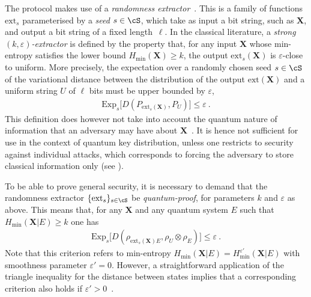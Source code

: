 The protocol makes use of a \emph{randomness extractor}~\cite{Zuc90,Shaltiel04}. This is a family of functions $\mathrm{ext}_s$ parameterised by a \emph{seed} $s \in \cS$, which take as input a bit string, such as $\mathbf{X}$, and output a bit string of a fixed length~$\ell$. In the classical literature, a \emph{strong $(k, \varepsilon)$-extractor} is defined by the property that, for any input $\mathbf{X}$ whose min-entropy satisfies the lower bound $H_{\min}(\mathbf{X}) \geq k$, the output $\mathrm{ext}_s(\mathbf{X})$ is $\varepsilon$-close to uniform. More precisely, the expectation over a randomly chosen seed $s \in \cS$ of the variational distance between the distribution of the output $\mathrm{ext}(\mathbf{X})$ and a uniform string $U$ of $\ell$ bits must be upper bounded by $\varepsilon$,
\begin{align}
  \mathrm{Exp}_s\bigl[D(P_{\mathrm{ext}_s(\mathbf{X})}, P_{U})\bigr] \leq \varepsilon \ .
\end{align}
This definition does however not take into account the quantum nature of information that an adversary may have about $\mathbf{X}$~\cite{KMR05,GKKRD07}. It is hence not sufficient for use in the context of quantum key distribution, unless one restricts to security against individual attacks, which corresponds to forcing the adversary to store classical information only (see ). 

To be able to prove general security, it is necessary to demand that the randomness extractor $\{\mathrm{ext}_s\}_{s \in \cS}$ be \emph{quantum-proof}, for parameters $k$ and $\varepsilon$ as above. This means that, for any $\mathbf{X}$ and any quantum system $E$ such that $H_{\min}(\mathbf{X} | E) \geq k$ one has
\begin{align}
 \mathrm{Exp}_s\bigl[D(\rho_{\mathrm{ext}_s(\mathbf{X}) E}, \rho_{U} \otimes \rho_E)\bigr] \leq \varepsilon \ .
\end{align}
Note that this criterion refers to min-entropy $H_{\min}(\mathbf{X} | E) = H_{\min}^{\varepsilon'}(\mathbf{X} | E)$ with smoothness parameter $\varepsilon' = 0$. However, a straightforward application of the triangle inequality for the distance between states implies that a corresponding criterion  also holds if $\varepsilon'>0$~\cite{Ren05}. 

